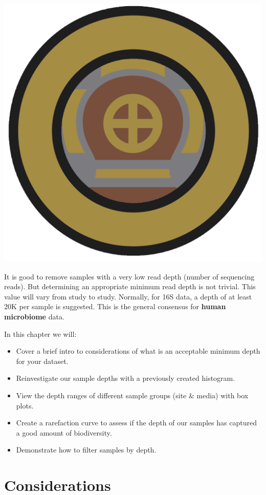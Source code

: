 \documentclass[
]{book}
\providecommand{\tightlist}{%
  \setlength{\itemsep}{0pt}\setlength{\parskip}{0pt}}
\begin{document}
\includegraphics{figures/depth_diver.png}

It is good to remove samples with a very low read depth (number of sequencing reads).
But determining an appropriate minimum read depth is not trivial.
This value will vary from study to study.
Normally, for 16S data, a depth of at least 20K per sample is suggested.
This is the general consensus for \textbf{human microbiome} data.

In this chapter we will:

\begin{itemize}
\tightlist
\item
  Cover a brief intro to considerations of what is an acceptable minimum depth for your dataset.
\item
  Reinvestigate our sample depths with a previously created histogram.
\item
  View the depth ranges of different sample groups (site \& media) with box plots.
\item
  Create a rarefaction curve to assess if the depth of our samples has captured a good amount of biodiversity.
\item
  Demonstrate how to filter samples by depth.
\end{itemize}

\hypertarget{considerations}{%
\section{Considerations}\label{considerations}}
\end{document}
